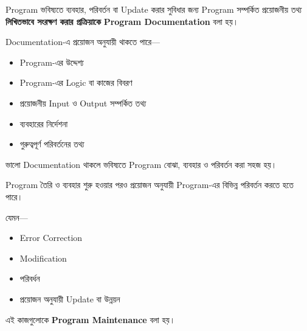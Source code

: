 \begin{definitionbox}

Program ভবিষ্যতে ব্যবহার, পরিবর্তন বা Update করার সুবিধার জন্য
Program সম্পর্কিত প্রয়োজনীয় তথ্য
\textbf{লিখিতভাবে সংরক্ষণ করার প্রক্রিয়াকে}
\textbf{Program Documentation} বলা হয়।

\end{definitionbox}

Documentation-এ প্রয়োজন অনুযায়ী থাকতে পারে—

\begin{itemize}

\item Program-এর উদ্দেশ্য
\item Program-এর Logic বা কাজের বিবরণ
\item প্রয়োজনীয় Input ও Output সম্পর্কিত তথ্য
\item ব্যবহারের নির্দেশনা
\item গুরুত্বপূর্ণ পরিবর্তনের তথ্য

\end{itemize}

ভালো Documentation থাকলে ভবিষ্যতে Program বোঝা,
ব্যবহার ও পরিবর্তন করা সহজ হয়।


Program তৈরি ও ব্যবহার শুরু হওয়ার পরও প্রয়োজন অনুযায়ী
Program-এর বিভিন্ন পরিবর্তন করতে হতে পারে।

যেমন—

\begin{itemize}

\item Error Correction
\item Modification
\item পরিবর্ধন
\item প্রয়োজন অনুযায়ী Update বা উন্নয়ন

\end{itemize}

এই কাজগুলোকে \textbf{Program Maintenance} বলা হয়।


